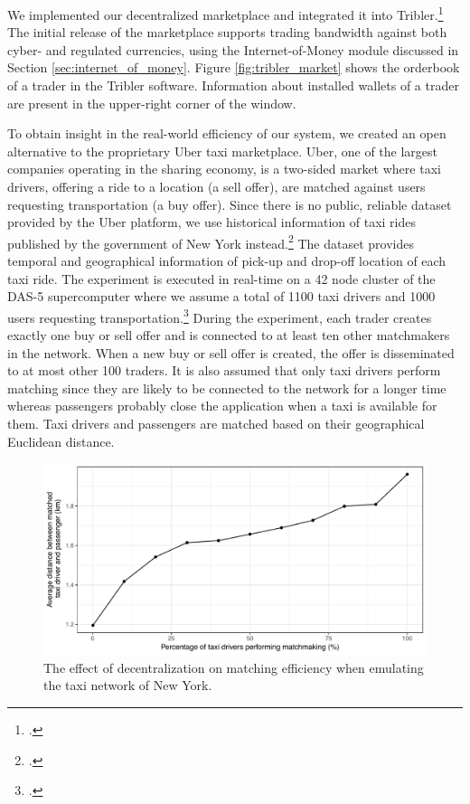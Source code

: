 \documentclass[USenglish]{article}
\begin{document}
We implemented our decentralized marketplace and integrated it into Tribler.\footcite{pouwelse2008tribler}
The initial release of the marketplace supports trading bandwidth against both cyber- and regulated currencies, using the Internet-of-Money module discussed in Section \ref{sec:internet_of_money}.
Figure \ref{fig:tribler_market} shows the orderbook of a trader in the Tribler software.
Information about installed wallets of a trader are present in the upper-right corner of the window.

To obtain insight in the real-world efficiency of our system, we created an open alternative to the proprietary Uber taxi marketplace.
Uber, one of the largest companies operating in the sharing economy, is a two-sided market where taxi drivers, offering a ride to a location (a sell offer), are matched against users requesting transportation (a buy offer).
Since there is no public, reliable dataset provided by the Uber platform, we use historical information of taxi rides published by the government of New York instead.\footcite{newyorktaxi}
The dataset provides temporal and geographical information of pick-up and drop-off location of each taxi ride.
The experiment is executed in real-time on a 42 node cluster of the DAS-5 supercomputer where we assume a total of 1100 taxi drivers and 1000 users requesting transportation.\footcite{bal2016medium}
During the experiment, each trader creates exactly one buy or sell offer and is connected to at least ten other matchmakers in the network.
When a new buy or sell offer is created, the offer is disseminated to at most other 100 traders.
It is also assumed that only taxi drivers perform matching since they are likely to be connected to the network for a longer time whereas passengers probably close the application when a taxi is available for them.
Taxi drivers and passengers are matched based on their geographical Euclidean distance.

\begin{figure}[t]
	\centering
	\includegraphics[width=0.9\columnwidth]{assets/matching_efficiency}
	\caption{The effect of decentralization on matching efficiency when emulating the taxi network of New York.}
	\label{fig:matching_efficiency}
\end{figure}
\end{document}
